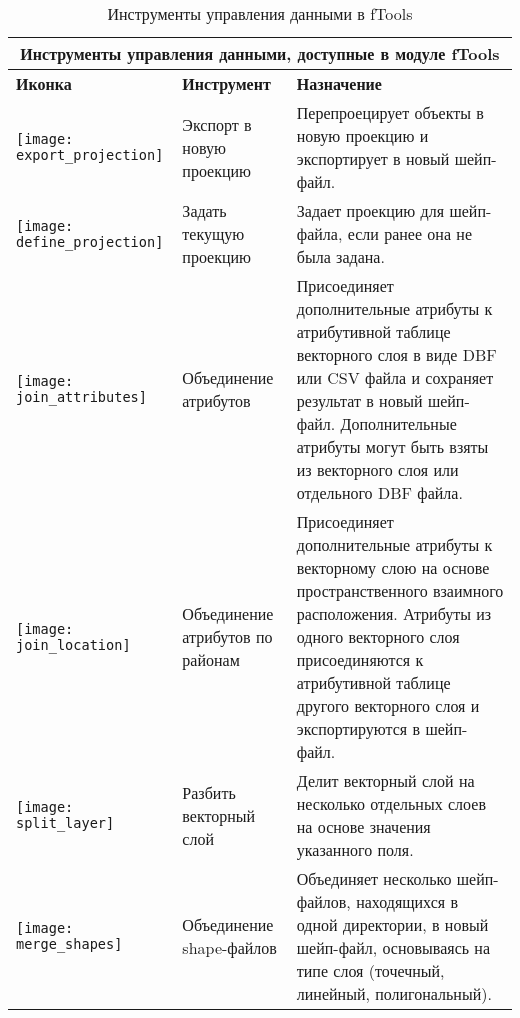 \begin{table}[ht]
\centering
\begin{tabular}{|m{1cm}|m{4cm}|m{9cm}|}
 \hline \multicolumn{3}{|c|}{\textbf{Инструменты управления данными, доступные в модуле fTools}} \\
 \hline \textbf{Иконка} & \textbf{Инструмент} & \textbf{Назначение} \\
 \hline \texttt{[image: export\_projection]} & Экспорт в новую проекцию &
 Перепроецирует объекты в новую проекцию и экспортирует в новый шейп-файл. \\
 \hline \texttt{[image: define\_projection]} & Задать текущую проекцию &
 Задает проекцию для шейп-файла, если ранее она не была задана. \\
 \hline \texttt{[image: join\_attributes]} & Объединение атрибутов & Присоединяет
 дополнительные атрибуты к атрибутивной таблице векторного слоя в виде DBF или CSV файла и
 сохраняет результат в новый шейп-файл. Дополнительные атрибуты могут быть взяты из
 векторного слоя или отдельного DBF файла. \\
 \hline \texttt{[image: join\_location]} & Объединение атрибутов по районам & Присоединяет
 дополнительные атрибуты к векторному слою на основе пространственного взаимного расположения.
 Атрибуты из одного векторного слоя присоединяются к атрибутивной таблице другого векторного слоя и
 экспортируются в шейп-файл. \\
 \hline \texttt{[image: split\_layer]} & Разбить векторный слой &
 Делит векторный слой на несколько отдельных слоев на основе значения указанного поля. \\
 \hline \texttt{[image: merge\_shapes]} & Объединение shape-файлов &
 Объединяет несколько шейп-файлов, находящихся в одной директории, в новый шейп-файл,
 основываясь на типе слоя (точечный, линейный, полигональный). \\
 \hline
\end{tabular}
\caption{Инструменты управления данными в fTools}\label{tab:fTool_data_management}
\end{table}

\FloatBarrier

